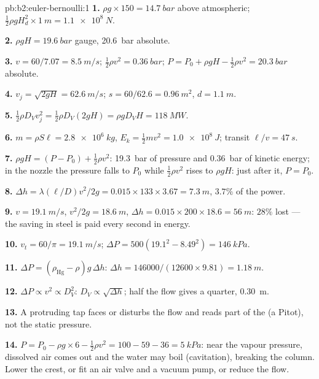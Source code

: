 \begin{solution}{pb:b2:euler-bernoulli:1}
\textbf{1.} $\rho g \times 150 = \qty{14.7}{bar}$ above atmospheric; $\tfrac12\rho gH_d^2
\times \qty{1}{m} = \qty{1.1e8}{N}$.

\textbf{2.} $\rho gH = \qty{19.6}{bar}$ gauge, \qty{20.6}{bar} absolute.

\textbf{3.} $v = 60/7.07 = \qty{8.5}{m/s}$; $\tfrac12\rho v^2 = \qty{0.36}{bar}$; $P =
P_0 + \rho gH - \tfrac12\rho v^2 = \qty{20.3}{bar}$ absolute.

\textbf{4.} $v_j = \sqrt{2gH} = \qty{62.6}{m/s}$; $s = 60/62.6 = \qty{0.96}{m^2}$, $d =
\qty{1.1}{m}$.

\textbf{5.} $\tfrac12\rho D_Vv_j^2 = \tfrac12\rho D_V(2gH) = \rho gD_VH = \qty{118}{MW}$.

\textbf{6.} $m = \rho S\ell = \qty{2.8e6}{kg}$, $E_k = \tfrac12mv^2 = \qty{1.0e8}{J}$;
transit $\ell/v = \qty{47}{s}$.

\textbf{7.} $\rho gH = (P - P_0) + \tfrac12\rho v^2$: \qty{19.3}{bar} of pressure
and \qty{0.36}{bar} of kinetic energy; in the nozzle the pressure falls
to $P_0$ while $\tfrac12\rho v^2$ rises to $\rho gH$: just after it, $P = P_0$.

\textbf{8.} $\Delta h = \lambda(\ell/D)v^2/2g = 0.015 \times 133 \times 3.67 = \qty{7.3}{m}$,
$3.7\%$ of the power.

\textbf{9.} $v = \qty{19.1}{m/s}$, $v^2/2g = \qty{18.6}{m}$, $\Delta h = 0.015 \times 200 \times
18.6 = \qty{56}{m}$: $28\%$ lost --- the saving in steel is paid every
second in energy.

\textbf{10.} $v_t = 60/\pi = \qty{19.1}{m/s}$; $\Delta P = 500(19.1^2 - 8.49^2) =
\qty{146}{kPa}$.

\textbf{11.} $\Delta P = (\rho_{\text{Hg}} - \rho)g\,\Delta h$: $\Delta h = 146000/(12600
\times 9.81) = \qty{1.18}{m}$.

\textbf{12.} $\Delta P \propto v^2 \propto D_V^2$: $D_V \propto \sqrt{\Delta h}$; half the
flow gives a quarter, \qty{0.30}{m}.

\textbf{13.} A protruding tap faces or disturbs the flow and reads part
of the  (a Pitot), not the static pressure.

\textbf{14.} $P = P_0 - \rho g \times 6 - \tfrac12\rho v^2 = 100 - 59 - 36 = \qty{5}{kPa}$:
near the vapour pressure, dissolved air comes out and the water may
boil (cavitation), breaking the column. Lower the crest, or fit an air
valve and a vacuum pump, or reduce the flow.


\end{solution}

